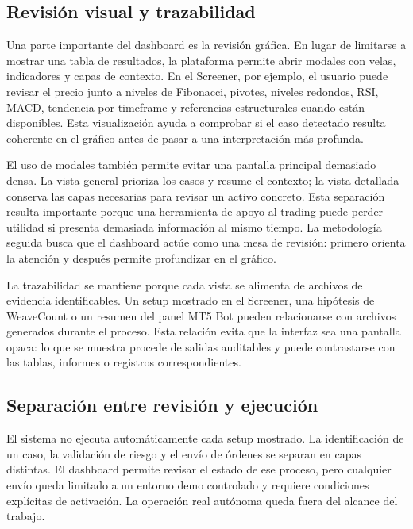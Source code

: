 \subsection{Revisi\'on visual y trazabilidad}
\label{subsec:dashboard-revision-visual-trazabilidad}

Una parte importante del dashboard es la revisi\'on gr\'afica. En lugar de
limitarse a mostrar una tabla de resultados, la plataforma permite abrir modales
con velas, indicadores y capas de contexto. En el Screener, por ejemplo, el
usuario puede revisar el precio junto a niveles de Fibonacci, pivotes, niveles
redondos, RSI, MACD, tendencia por timeframe y referencias estructurales
cuando est\'an disponibles. Esta visualizaci\'on ayuda a comprobar si el caso
detectado resulta coherente en el gr\'afico antes de pasar a una interpretaci\'on
m\'as profunda.

El uso de modales tambi\'en permite evitar una pantalla principal demasiado
densa. La vista general prioriza los casos y resume el contexto; la vista
detallada conserva las capas necesarias para revisar un activo concreto. Esta
separaci\'on resulta importante porque una herramienta de apoyo al trading puede
perder utilidad si presenta demasiada informaci\'on al mismo tiempo. La
metodolog\'ia seguida busca que el dashboard act\'ue como una mesa de revisi\'on:
primero orienta la atenci\'on y despu\'es permite profundizar en el gr\'afico.

La trazabilidad se mantiene porque cada vista se alimenta de archivos de evidencia
identificables. Un setup mostrado en el Screener, una hip\'otesis de WeaveCount o
un resumen del panel MT5 Bot pueden relacionarse con archivos generados durante
el proceso. Esta relaci\'on evita que la interfaz sea una pantalla opaca: lo que
se muestra procede de salidas auditables y puede contrastarse con las tablas,
informes o registros correspondientes.

\subsection{Separaci\'on entre revisi\'on y ejecuci\'on}
\label{subsec:dashboard-separacion-revision-ejecucion}

El sistema no ejecuta autom\'aticamente cada setup mostrado. La identificaci\'on de un
caso, la validaci\'on de riesgo y el env\'io de \'ordenes se separan en capas
distintas. El dashboard permite revisar el estado de ese proceso, pero cualquier
env\'io queda limitado a un entorno demo controlado y requiere condiciones
expl\'icitas de activaci\'on. La operaci\'on real aut\'onoma queda fuera del alcance del
trabajo.

